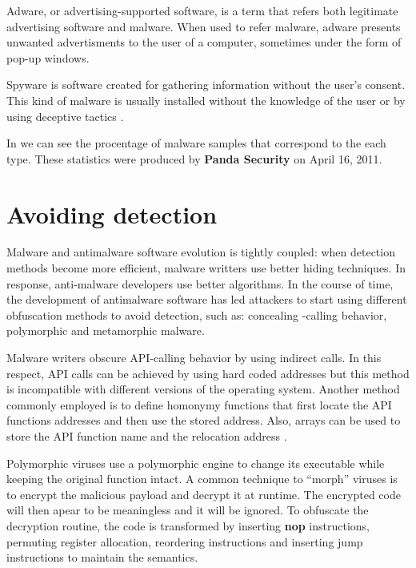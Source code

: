 Adware, or advertising-supported software, is a term that refers both legitimate advertising software and malware. When used to refer malware, adware presents unwanted advertisments to the user of a computer, sometimes under the form of pop-up windows.

Spyware is software created for gathering information without the user's consent. This kind of malware is usually installed without the knowledge of the user or by using deceptive tactics \cite{mal-behavior-analysis}.

In  we can see the procentage of malware samples that correspond to the each type. These statistics were produced by \textbf{Panda Security} on April 16, 2011.


\section{Avoiding detection}
\label{sec:avoid-det}

Malware and antimalware software evolution is tightly coupled: when detection methods become more efficient, malware writters use better hiding techniques. In response, anti-malware developers use better algorithms. In the course of time, the development of antimalware software has led attackers to start using different obfuscation methods to avoid detection, such as: concealing -calling behavior, polymorphic and metamorphic malware.

Malware writers obscure API-calling behavior by using indirect calls. In this respect, API calls can be achieved by using hard coded addresses but this method is incompatible with different versions of the operating system. Another method commonly employed is to define homonymy functions that first locate the API functions addresses and then use the stored address. Also, arrays can be used to store the API function name and the relocation address \cite{static-detection-behavior}.

Polymorphic viruses use a polymorphic engine to change its executable while keeping the original function intact. A common technique to ``morph'' viruses is to encrypt the malicious payload and decrypt it at runtime. The encrypted code will then apear to be meaningless and it will be ignored. To obfuscate the decryption routine, the code is transformed by inserting \textbf{nop} instructions, permuting register allocation, reordering instructions and inserting jump instructions to maintain the semantics.

